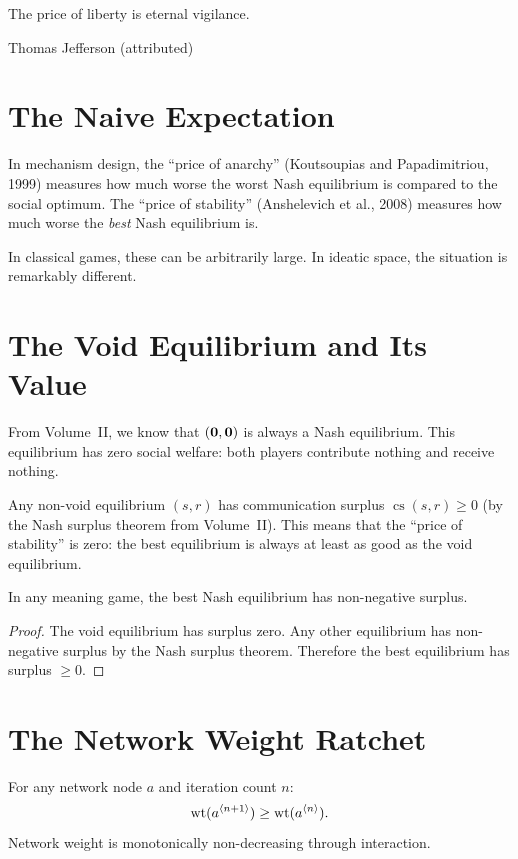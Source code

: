\epigraph{The price of liberty is eternal vigilance.}{Thomas Jefferson (attributed)}

\section{The Naive Expectation}

In mechanism design, the ``price of anarchy'' (Koutsoupias and Papadimitriou, 1999) measures how much worse the worst Nash equilibrium is compared to the social optimum. The ``price of stability'' (Anshelevich et al., 2008) measures how much worse the \emph{best} Nash equilibrium is.

In classical games, these can be arbitrarily large. In ideatic space, the situation is remarkably different.

\section{The Void Equilibrium and Its Value}

From Volume~II, we know that $(\mathbf{0}, \mathbf{0})$ is always a Nash equilibrium. This equilibrium has zero social welfare: both players contribute nothing and receive nothing.

Any non-void equilibrium $(s, r)$ has communication surplus $\operatorname{cs}(s,r) \geq 0$ (by the Nash surplus theorem from Volume~II). This means that the ``price of stability'' is zero: the best equilibrium is always at least as good as the void equilibrium.

\begin{theorem}
In any meaning game, the best Nash equilibrium has non-negative surplus.
\end{theorem}

\begin{proof}
The void equilibrium has surplus zero. Any other equilibrium has non-negative surplus by the Nash surplus theorem. Therefore the best equilibrium has surplus $\geq 0$.
\end{proof}

\section{The Network Weight Ratchet}

\begin{theorem}
For any network node $a$ and iteration count $n$:
\[
\operatorname{wt}(a^{\langle n+1 \rangle}) \geq \operatorname{wt}(a^{\langle n \rangle}).
\]
Network weight is monotonically non-decreasing through interaction.
\end{theorem}

